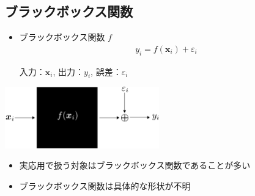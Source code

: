 \documentclass[dvipdfmx, 10.5pt]{beamer}
\begin{document}



\subsection{ブラックボックス関数}
\begin{frame}{\insertsubsection}
	\begin{itemize}
		\item ブラックボックス関数 $f$
		\begin{align*}
			y_i = f(\bm x_i) + \varepsilon_i
		\end{align*}
		\begin{center}
			入力：$\bm x_i$,\quad
			出力：$y_i$,\quad
			誤差：$\varepsilon_i$
		\end{center}
	\end{itemize}

	\begin{center}
		\includegraphics[width=0.50\textwidth]{./Fig/blackbox.pdf}
	\end{center}

	\begin{itemize}
		\item 実応用で扱う対象はブラックボックス関数であることが多い
		\item ブラックボックス関数は具体的な形状が不明

	\end{itemize}
\end{frame}

\end{document}
